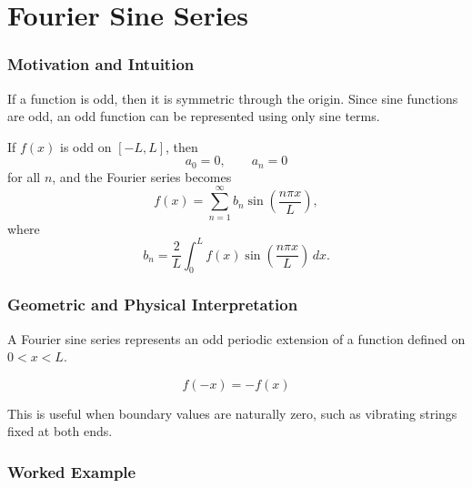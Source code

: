 \section{Fourier Sine Series}

\subsubsection*{Motivation and Intuition}

If a function is odd, then it is symmetric through the origin. Since sine functions are odd, an odd function can be represented using only sine terms.

\begin{conceptbox}
    If $f(x)$ is odd on $[-L,L]$, then
    \[
        a_0=0,\qquad a_n=0
    \]
    for all $n$, and the Fourier series becomes
    \[
        f(x)=\sum_{n=1}^{\infty}
        b_n\sin\left(\frac{n\pi x}{L}\right),
    \]
    where
    \[
        b_n=\frac{2}{L}\int_0^L
        f(x)\sin\left(\frac{n\pi x}{L}\right)\,dx.
    \]
\end{conceptbox}

\subsubsection*{Geometric and Physical Interpretation}

A Fourier sine series represents an odd periodic extension of a function defined on $0<x<L$.

\[
    f(-x)=-f(x)
\]

This is useful when boundary values are naturally zero, such as vibrating strings fixed at both ends.

\subsubsection*{Worked Example}

